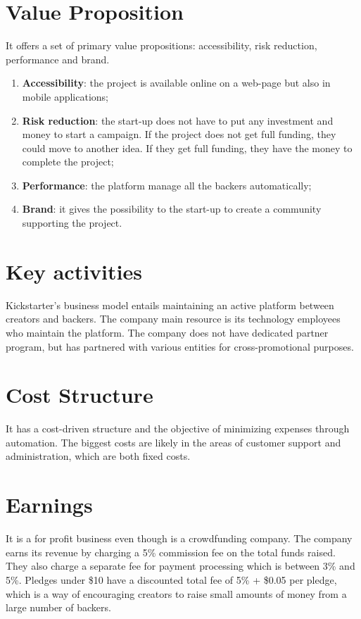 \documentclass{report}
\begin{document}
\section{Value Proposition}\label{valueprop}
It offers a set of primary value propositions: accessibility, risk reduction, performance and brand.
\begin{enumerate}
    \item \textbf{Accessibility}: the project is available online on a web-page but also in mobile applications;
    \item \textbf{Risk reduction}: the start-up does not have to put any investment and money to start a campaign. If the project does not get full funding, they could move to another idea. If they get full funding, they have the money to complete the project;
    \item \textbf{Performance}: the platform manage all the backers automatically;
    \item \textbf{Brand}: it gives the possibility to the start-up to create a community supporting the project.
\end{enumerate}

\newpage
\section{Key activities}\label{keysact}
Kickstarter's business model entails maintaining an active platform between creators and backers. The company main resource is its technology employees who maintain the platform. 
The company does not have dedicated partner program, but has partnered with various entities for cross-promotional purposes.

\section{Cost Structure} \label{costs}
It has a cost-driven structure and the objective of minimizing expenses through automation. The biggest costs are likely in the areas of customer support and administration, which are both fixed costs.

\section{Earnings} \label{earnings}
It is a for profit business even though is a crowdfunding company. The company earns its revenue by charging a 5\% commission fee on the total funds raised. They also charge a separate fee for payment processing which is between 3\% and 5\%. Pledges under \$10 have a discounted total fee of 5\% + \$0.05 per pledge, which is a way of encouraging creators to raise small amounts of money from a large number of backers.
\end{document}
